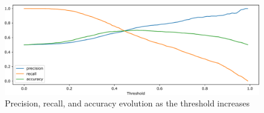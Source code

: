 \documentclass[a4paper,11pt]{article}
\begin{document}
\vspace{2em}
\begin{figure}[!htb]
	\centering
	\includegraphics[width=1\textwidth]{images/precision_recall_evolution.pdf}
	\caption{Precision, recall, and accuracy evolution as the threshold increases}
	\label{fig:precision_recall_evolution}
\end{figure}
\end{document}
